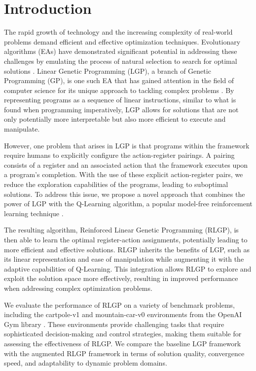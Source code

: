 \documentclass[12pt, final]{dalcsthesis}
\begin{document}
\mainmatter

\chapter{Introduction}
The rapid growth of technology and the increasing complexity of real-world problems demand efficient and effective optimization techniques. Evolutionary algorithms (EAs) have demonstrated significant potential in addressing these challenges by emulating the process of natural selection to search for optimal solutions \cite{poli08}. Linear Genetic Programming (LGP), a branch of Genetic Programming (GP), is one such EA that has gained attention in the field of computer science for its unique approach to tackling complex problems \cite{song03}. By representing programs as a sequence of linear instructions, similar to what is found when programming imperatively, LGP allows for solutions that are not only potentially more interpretable but also more efficient to execute and manipulate.

However, one problem that arises in LGP is that programs within the framework require humans to explicitly configure the action-register pairings. A pairing consists of a register and an associated action that the framework executes upon a program's completion. With the use of these explicit action-register pairs, we reduce the exploration capabilities of the programs, leading to suboptimal solutions. To address this issue, we propose a novel approach that combines the power of LGP with the Q-Learning algorithm, a popular model-free reinforcement learning technique \cite{sutton2018reinforcement}.

The resulting algorithm, Reinforced Linear Genetic Programming (RLGP), is then able to learn the optimal register-action assignments, potentially leading to more efficient and effective solutions. RLGP inherits the benefits of LGP, such as its linear representation and ease of manipulation while augmenting it with the adaptive capabilities of Q-Learning. This integration allows RLGP to explore and exploit the solution space more effectively, resulting in improved performance when addressing complex optimization problems.

We evaluate the performance of RLGP on a variety of benchmark problems, including the cartpole-v1 and mountain-car-v0 environments from the OpenAI Gym library \cite{1606.01540}. These environments provide challenging tasks that require sophisticated decision-making and control strategies, making them suitable for assessing the effectiveness of RLGP. We compare the baseline LGP framework with the augmented RLGP framework in terms of solution quality, convergence speed, and adaptability to dynamic problem domains.
\end{document}

